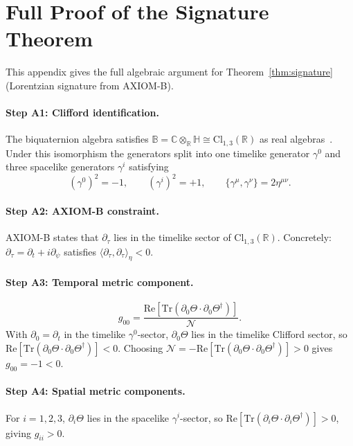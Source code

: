 \documentclass[12pt,a4paper]{article}
\theoremstyle{definition}
\theoremstyle{remark}
\newcommand{\BB}{\mathbb{B}}
\newcommand{\CC}{\mathbb{C}}
\newcommand{\RR}{\mathbb{R}}
\newcommand{\HH}{\mathbb{H}}
\newcommand{\Tr}{\mathrm{Tr}}
\newcommand{\re}{\mathrm{Re}}
\newcommand{\calN}{\mathcal{N}}
\begin{document}
\appendix

\section{Full Proof of the Signature Theorem}
\label{app:signature}

This appendix gives the full algebraic argument for
Theorem~\ref{thm:signature} (Lorentzian signature from AXIOM-B).

\paragraph{Step A1: Clifford identification.}
The biquaternion algebra satisfies
$\BB = \CC\otimes_\RR\HH \cong \mathrm{Cl}_{1,3}(\RR)$
as real algebras~\cite{porteous1995}.
Under this isomorphism the generators split into one timelike generator
$\gamma^0$ and three spacelike generators $\gamma^i$ satisfying
\[
  (\gamma^0)^2 = -1, \qquad
  (\gamma^i)^2 = +1, \qquad
  \{\gamma^\mu,\gamma^\nu\} = 2\eta^{\mu\nu}.
\]

\paragraph{Step A2: AXIOM-B constraint.}
AXIOM-B states that $\partial_\tau$ lies in the timelike sector of
$\mathrm{Cl}_{1,3}(\RR)$.
Concretely: $\partial_\tau = \partial_t + i\partial_\psi$ satisfies
$\langle\partial_\tau,\partial_\tau\rangle_\eta < 0$.

\paragraph{Step A3: Temporal metric component.}
\[
  g_{00}
  = \frac{\re[\Tr(\partial_0\Theta \cdot \partial_0\Theta^\dagger)]}{\calN}.
\]
With $\partial_0 = \partial_t$ in the timelike $\gamma^0$-sector,
$\partial_0\Theta$ lies in the timelike Clifford sector, so
$\re[\Tr(\partial_0\Theta \cdot \partial_0\Theta^\dagger)] < 0$.
Choosing $\calN = -\re[\Tr(\partial_0\Theta \cdot \partial_0\Theta^\dagger)] > 0$
gives $g_{00} = -1 < 0$.

\paragraph{Step A4: Spatial metric components.}
For $i = 1,2,3$, $\partial_i\Theta$ lies in the spacelike $\gamma^i$-sector,
so $\re[\Tr(\partial_i\Theta \cdot \partial_i\Theta^\dagger)] > 0$,
giving $g_{ii} > 0$.
\end{document}
